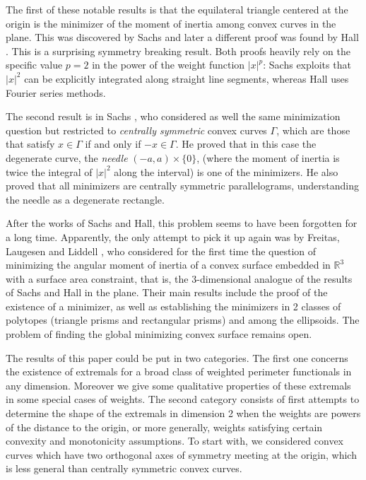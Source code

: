 \documentclass[10pt,leqno]{amsart}
\newcommand{\R}[0]{\mathbb{R}}
\numberwithin{Theorem}{section}
\theoremstyle{definition}
\theoremstyle{remark}
\numberwithin{equation}{section}
\numberwithin{equation}{section}
\begin{document}
The first of these notable results is that the equilateral triangle centered at the origin is the minimizer of the moment of inertia among convex curves in the plane. This was discovered by Sachs \cite{SachsIandII} and later a different proof was found by Hall \cite{Hall1985}. This is a surprising symmetry breaking result. Both proofs heavily rely on the specific value $p=2$ in the power of the weight function $|x|^p$: Sachs exploits that $|x|^2$ can be explicitly integrated along straight line segments, whereas Hall uses Fourier series methods. 

The second result is in Sachs \cite{SachsIandII}, who considered as well the same minimization question but restricted to  \textit{centrally symmetric} convex curves $\Gamma$, which are those that satisfy $x\in\Gamma$ if and only if $-x\in\Gamma.$ He proved that in this case
the degenerate curve,  the \textit{needle} $(-a,a)\times\{0\}$, (where the moment of inertia is twice the integral of $|x|^2$ along the interval) is one of the minimizers. He also proved that all minimizers are centrally symmetric parallelograms, understanding the needle as a degenerate rectangle.



After the works of Sachs and Hall, this problem seems to have been forgotten for a long time. Apparently, the only attempt to pick it up again was by Freitas, Laugesen and Liddell
\cite{FreitasLaugesenLiddell}, who considered for the first time the question of minimizing the angular moment of inertia of a convex surface embedded in $\R^3$ with a surface area constraint, that is, the $3$-dimensional analogue of the  results of Sachs and Hall in the plane. Their main results include the proof of the existence of a minimizer, as well as establishing the minimizers in 2 classes of polytopes (triangle prisms and rectangular prisms) and among the ellipsoids. The problem of finding the global minimizing convex surface remains open.



The results of this paper could be put in two categories. The first one concerns the existence of extremals for a broad class of weighted perimeter functionals in any dimension. Moreover we give some qualitative properties of these extremals in some special cases of weights. The second category consists of first attempts to  determine the shape of the extremals in dimension 2 when the weights are powers of the distance to the origin, or more generally, weights satisfying certain convexity and monotonicity assumptions. To start with, we  considered convex curves which have two orthogonal axes of symmetry meeting at the origin, which is less general than centrally symmetric convex curves. 
\end{document}
